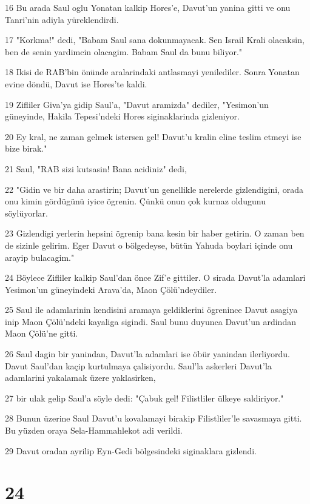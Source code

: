 \par 16 Bu arada Saul oglu Yonatan kalkip Hores'e, Davut'un yanina gitti ve onu Tanri'nin adiyla yüreklendirdi.
\par 17 "Korkma!" dedi, "Babam Saul sana dokunmayacak. Sen Israil Krali olacaksin, ben de senin yardimcin olacagim. Babam Saul da bunu biliyor."
\par 18 Ikisi de RAB'bin önünde aralarindaki antlasmayi yenilediler. Sonra Yonatan evine döndü, Davut ise Hores'te kaldi.
\par 19 Zifliler Giva'ya gidip Saul'a, "Davut aramizda" dediler, "Yesimon'un güneyinde, Hakila Tepesi'ndeki Hores siginaklarinda gizleniyor.
\par 20 Ey kral, ne zaman gelmek istersen gel! Davut'u kralin eline teslim etmeyi ise bize birak."
\par 21 Saul, "RAB sizi kutsasin! Bana acidiniz" dedi,
\par 22 "Gidin ve bir daha arastirin; Davut'un genellikle nerelerde gizlendigini, orada onu kimin gördügünü iyice ögrenin. Çünkü onun çok kurnaz oldugunu söylüyorlar.
\par 23 Gizlendigi yerlerin hepsini ögrenip bana kesin bir haber getirin. O zaman ben de sizinle gelirim. Eger Davut o bölgedeyse, bütün Yahuda boylari içinde onu arayip bulacagim."
\par 24 Böylece Zifliler kalkip Saul'dan önce Zif'e gittiler. O sirada Davut'la adamlari Yesimon'un güneyindeki Arava'da, Maon Çölü'ndeydiler.
\par 25 Saul ile adamlarinin kendisini aramaya geldiklerini ögrenince Davut asagiya inip Maon Çölü'ndeki kayaliga sigindi. Saul bunu duyunca Davut'un ardindan Maon Çölü'ne gitti.
\par 26 Saul dagin bir yanindan, Davut'la adamlari ise öbür yanindan ilerliyordu. Davut Saul'dan kaçip kurtulmaya çalisiyordu. Saul'la askerleri Davut'la adamlarini yakalamak üzere yaklasirken,
\par 27 bir ulak gelip Saul'a söyle dedi: "Çabuk gel! Filistliler ülkeye saldiriyor."
\par 28 Bunun üzerine Saul Davut'u kovalamayi birakip Filistliler'le savasmaya gitti. Bu yüzden oraya Sela-Hammahlekot adi verildi.
\par 29 Davut oradan ayrilip Eyn-Gedi bölgesindeki siginaklara gizlendi.

\chapter{24}

